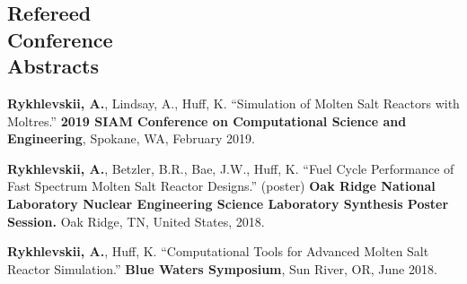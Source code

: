 \documentclass[margin,line]{resume}
\begin{document}
\begin{resume}
    \section{\mysidestyle Refereed\\Conference\\Abstracts}
    \begin{bibenum} 
    \item \textbf{Rykhlevskii, A.}, Lindsay, A., Huff, K. ``Simulation of Molten Salt Reactors with Moltres.'' \textbf{2019 SIAM Conference on Computational Science and Engineering}, 
            Spokane, WA, February 2019.
	\item \textbf{Rykhlevskii, A.}, Betzler, B.R., Bae, J.W., Huff, K. ``Fuel Cycle Performance of Fast Spectrum Molten Salt Reactor Designs.'' (poster)
            \textbf{Oak Ridge National Laboratory Nuclear Engineering Science Laboratory Synthesis Poster Session.} 
            Oak Ridge, TN, United States, 2018.
    \item \textbf{Rykhlevskii, A.}, Huff, K. ``Computational Tools for Advanced 
            Molten Salt Reactor Simulation.'' \textbf{Blue Waters Symposium}, 
            Sun River, OR, June 2018.
	\end{bibenum}

\end{resume}
\end{document}
